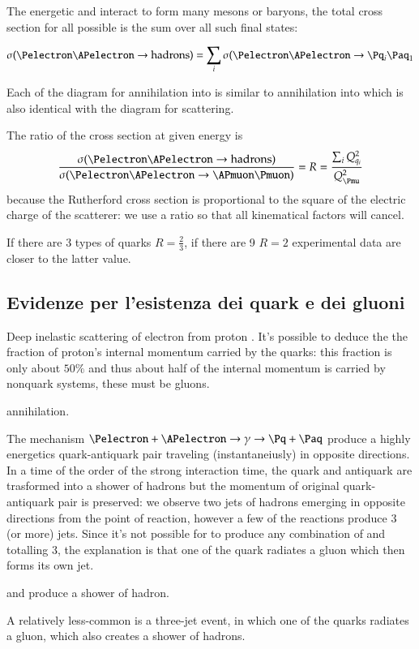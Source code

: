 \documentclass[main.tex]{subfiles}
\begin{document}
The energetic \Pq and \Paq interact to form many mesons or baryons, the total cross section for all possible \Pq\Paq is the sum over all such final states:

\begin{equation*}
\sigma(\Pelectron\APelectron\rightarrow\text{hadrons})=\sum_i\sigma(\Pelectron\APelectron\rightarrow\Pq_i\Paq_1
\end{equation*}

Each of the diagram for \Pelectron\APelectron annihilation into \Pq\Paq is similar to \Pelectron\APelectron annihilation into \Pmuon\APmuon which is also identical with the diagram for \Pelectron\Pmuon scattering.

The ratio of the cross section at given energy is
\begin{equation*}
\frac{\sigma(\Pelectron\APelectron\rightarrow\text{hadrons})}{\sigma(\Pelectron\APelectron\rightarrow\APmuon\Pmuon)}=R=\frac{\sum_iQ_{q_i}^2}{Q_{\Pmu}^2}
\end{equation*}
because the Rutherford cross section is proportional to the square of the electric charge of the scatterer: we use a ratio so that all kinematical factors will cancel.

If there are 3 types of quarks $R=\frac{2}{3}$, if there are 9 $R=2$ experimental data are closer to the latter value.

\subsection{Evidenze per l'esistenza dei quark e dei gluoni}

\begin{enumerate*}
\item Deep inelastic scattering of electron from proton
.
It's possible to deduce the the fraction of proton's internal momentum carried by the quarks: this fraction is only about $50\%$ and thus about half of the internal momentum is carried by nonquark systems, these must be gluons.

\item \Pelectron\APelectron annihilation.

The mechanism $\Pelectron+\APelectron\rightarrow\gamma\rightarrow\Pq+\Paq$ produce a highly energetics quark-antiquark pair traveling (instantaneiusly) in opposite directions. In a time of the order of the strong interaction time, the quark and antiquark are trasformed into a shower of hadrons but the momentum of original quark-antiquark pair is preserved: we observe two jets of hadrons emerging in opposite directions from the point of reaction, however a few of the reactions produce 3 (or more) jets. Since it's not possible for \Pelectron\APelectron to produce any combination of \Pq and \Paq totalling 3, the explanation is that one of the quark radiates a gluon which then forms its own jet.

\Pq and \Paq produce a shower of hadron.

A relatively less-common is a three-jet event, in which one of the quarks radiates a gluon, which also creates a shower of hadrons.

\end{enumerate*}
\end{document}
